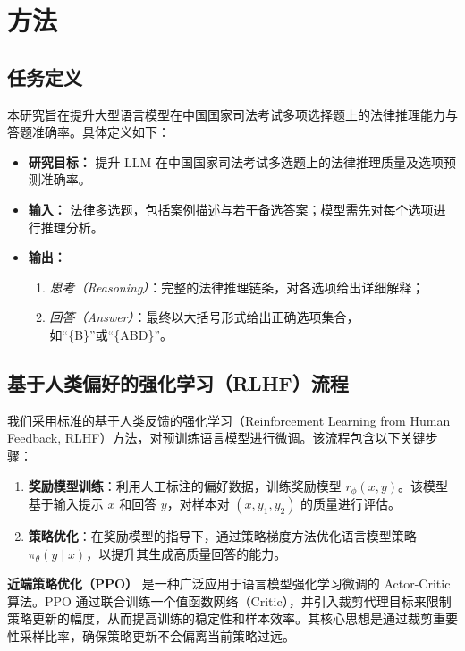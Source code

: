 \documentclass{pkuthesis}
\begin{document}
\section{方法}

\subsection{任务定义}
本研究旨在提升大型语言模型在中国国家司法考试多项选择题上的法律推理能力与答题准确率。具体定义如下：

\begin{itemize}
  \item \textbf{研究目标：}
    提升 LLM 在中国国家司法考试多选题上的法律推理质量及选项预测准确率。
  \item \textbf{输入：}
    法律多选题，包括案例描述与若干备选答案；模型需先对每个选项进行推理分析。
  \item \textbf{输出：}
    \begin{enumerate}
      \item \emph{思考（Reasoning）}：完整的法律推理链条，对各选项给出详细解释；
      \item \emph{回答（Answer）}：最终以大括号形式给出正确选项集合，如“\{B\}”或“\{ABD\}”。
    \end{enumerate}
\end{itemize}



\subsection{基于人类偏好的强化学习（RLHF）流程}
我们采用标准的基于人类反馈的强化学习（Reinforcement Learning from Human Feedback, RLHF）方法，对预训练语言模型进行微调。该流程包含以下关键步骤：
\begin{enumerate}
    \item \textbf{奖励模型训练}：利用人工标注的偏好数据，训练奖励模型 \( r_{\phi}(x, y) \)。该模型基于输入提示 \( x \) 和回答 \( y \)，对样本对 \((x, y_1, y_2)\) 的质量进行评估。
    \item \textbf{策略优化}：在奖励模型的指导下，通过策略梯度方法优化语言模型策略 \( \pi_{\theta}(y \mid x) \)，以提升其生成高质量回答的能力。
\end{enumerate}

\textbf{近端策略优化（PPO）} 是一种广泛应用于语言模型强化学习微调的 Actor-Critic 算法。PPO 通过联合训练一个值函数网络（Critic），并引入裁剪代理目标来限制策略更新的幅度，从而提高训练的稳定性和样本效率。其核心思想是通过裁剪重要性采样比率，确保策略更新不会偏离当前策略过远。
\end{document}
